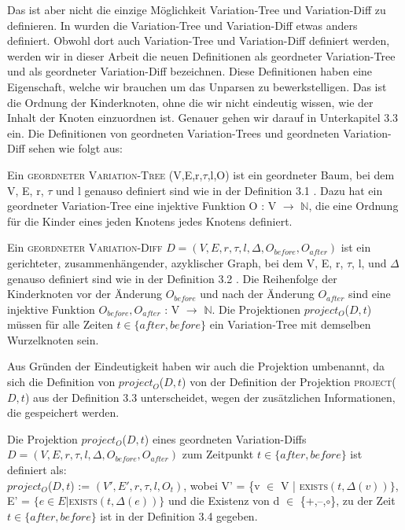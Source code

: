 Das ist aber nicht die einzige Möglichkeit Variation-Tree und Variation-Diff zu definieren. In \cite{Moosherr23} wurden die Variation-Tree und Variation-Diff etwas anders definiert. Obwohl dort auch Variation-Tree und Variation-Diff definiert werden, werden wir in dieser Arbeit die neuen Definitionen als geordneter Variation-Tree und als geordneter Variation-Diff bezeichnen. Diese Definitionen haben eine Eigenschaft, welche wir brauchen um das Unparsen zu bewerkstelligen. Das ist die Ordnung der Kinderknoten, ohne die wir nicht eindeutig wissen, wie der Inhalt der Knoten einzuordnen ist. Genauer gehen wir darauf in Unterkapitel 3.3 ein. Die Definitionen von geordneten Variation-Trees und geordneten Variation-Diff sehen wie folgt aus:
\begin{definition}
	Ein \textsc{geordneter Variation-Tree} (V,E,r,$\tau$,l,O) ist ein geordneter Baum, bei dem V, E, r, $\tau$ und l genauso definiert sind wie in der Definition 3.1 . Dazu hat ein geordneter Variation-Tree eine injektive Funktion O : V $\rightarrow$  $\mathbb{N}$, die eine Ordnung für die Kinder eines jeden Knotens jedes Knotens definiert.
\end{definition}
	

\begin{definition}
	Ein \textsc{geordneter Variation-Diff} $D=(V,E,r,\tau,l,\Delta,O_{before},O_{after}) $ ist ein gerichteter, zusammenhängender, azyklischer Graph, bei dem V, E, r, $\tau$, l, und $\Delta$ genauso definiert sind wie in der Definition 3.2 . Die Reihenfolge der Kinderknoten vor der Änderung $O_{before}$ und nach der Änderung $O_{after}$ sind eine injektive Funktion $O_{before},O_{after}$ : V $\rightarrow$ $\mathbb{N}$. Die Projektionen  \textsc{$project_{O}$}($D,t$) müssen für alle Zeiten  $t \in \{after,before\}$ ein Variation-Tree mit demselben Wurzelknoten sein.
	
\end{definition}

Aus Gründen der Eindeutigkeit haben wir auch die Projektion umbenannt, da sich die Definition von \textsc{$project_{O}$}($D,t$) von der Definition der Projektion \textsc{project}($D,t$) aus der Definition 3.3 unterscheidet, wegen der zusätzlichen Informationen, die gespeichert werden. 

\begin{definition}
	Die Projektion \textsc{$project_O$}($D,t$) eines geordneten Variation-Diffs \\$D=(V,E,r,\tau,l,\Delta,O_{before},O_{after}) $ zum Zeitpunkt $t \in \{after,before\}$ ist definiert als:\\ \textsc{$project_O$}($D,t$) := $(V',E',r,\tau,l,O_t)$, wobei V' = \{v $\in$ V | \textsc{exists}$(t,\Delta(v))\}$, \\ E' = $\{e \in E | $\textsc{exists}$(t,\Delta(e))\}$ und die Existenz von d $\in$ \{+,--,$\circ$\}, zu der Zeit $t \in \{after,before\}$ ist in der Definition 3.4 gegeben.
\end{definition}

